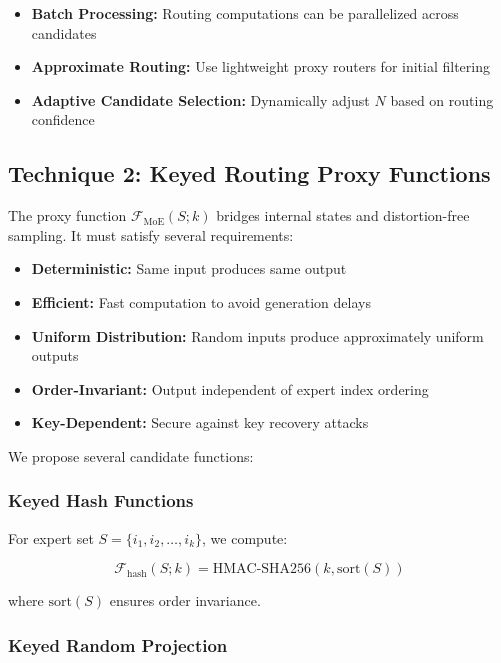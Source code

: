 \documentclass[letterpaper,twocolumn,10pt]{article}
\begin{document}
\begin{itemize}
\item \textbf{Batch Processing:} Routing computations can be parallelized across candidates
\item \textbf{Approximate Routing:} Use lightweight proxy routers for initial filtering
\item \textbf{Adaptive Candidate Selection:} Dynamically adjust $N$ based on routing confidence
\end{itemize}

\subsection{Technique 2: Keyed Routing Proxy Functions}

The proxy function $\mathcal{F}_{\text{MoE}}(S; k)$ bridges internal states and distortion-free sampling. It must satisfy several requirements:

\begin{itemize}
\item \textbf{Deterministic:} Same input produces same output
\item \textbf{Efficient:} Fast computation to avoid generation delays
\item \textbf{Uniform Distribution:} Random inputs produce approximately uniform outputs
\item \textbf{Order-Invariant:} Output independent of expert index ordering
\item \textbf{Key-Dependent:} Secure against key recovery attacks
\end{itemize}

We propose several candidate functions:

\subsubsection{Keyed Hash Functions}

For expert set $S = \{i_1, i_2, \ldots, i_k\}$, we compute:

\begin{equation}
\mathcal{F}_{\text{hash}}(S; k) = \text{HMAC-SHA256}(k, \text{sort}(S))
\end{equation}

where $\text{sort}(S)$ ensures order invariance.

\subsubsection{Keyed Random Projection}
\end{document}
